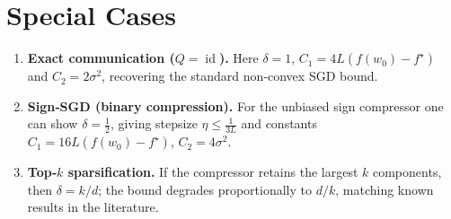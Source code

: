 \documentclass{article}
\begin{document}
\section*{Special Cases}
\begin{enumerate}[label=\arabic*.]
\item \textbf{Exact communication ($Q=\operatorname{id}$).} Here $\delta=1$, $C_{1}=4L(f(w_0)-f^\star)$ and $C_{2}=2\sigma^{2}$, recovering the standard non‑convex SGD bound.
\item \textbf{Sign‑SGD (binary compression).} For the unbiased sign compressor one can show $\delta=\frac{1}{2}$, giving stepsize $\eta\le\frac{1}{3L}$ and constants $C_{1}=16L(f(w_0)-f^\star)$, $C_{2}=4\sigma^{2}$.
\item \textbf{Top‑$k$ sparsification.} If the compressor retains the largest $k$ components, then $\delta=k/d$; the bound degrades proportionally to $d/k$, matching known results in the literature.
\end{enumerate}
\end{document}
